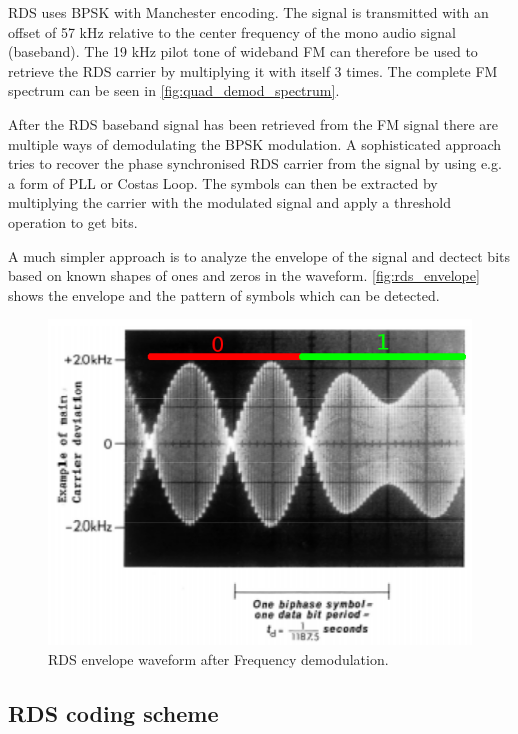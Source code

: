 \ac{RDS} uses \ac{BPSK} with Manchester encoding. The signal is
transmitted with an offset of 57 kHz relative to the center frequency
of the mono audio signal (baseband). The 19 kHz pilot tone of wideband \ac{FM}
can therefore be used to retrieve the \ac{RDS} carrier by multiplying
it with itself 3 times. The complete FM spectrum can be seen in
\autoref{fig:quad_demod_spectrum}.

After the \ac{RDS} baseband signal has been retrieved from the \ac{FM} signal
there are multiple ways of demodulating the \ac{BPSK} modulation. A sophisticated
approach tries to recover the phase synchronised \ac{RDS} carrier from the
signal by using e.g. a form of \ac{PLL} or Costas Loop. The symbols can then
be extracted by multiplying the carrier with the modulated signal and apply
a threshold operation to get bits.

A much simpler approach is to analyze the envelope of the signal and dectect
bits based on known shapes of ones and zeros in the waveform.
\autoref{fig:rds_envelope} shows the envelope and the pattern of symbols
which can be detected.

\begin{figure}
	\centering
	\includegraphics[width=1\linewidth]{gfx/rds/rds_waveform.png}
	\caption{RDS envelope waveform after Frequency demodulation. \cite{1999:iec62106}}
	\label{fig:rds_envelope}
\end{figure}



\subsection{RDS coding scheme}

